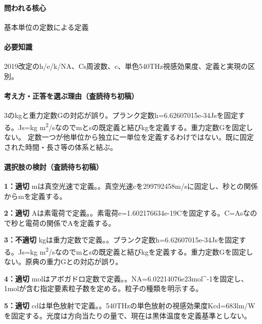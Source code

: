 \paragraph{問われる核心} 基本単位の定数による定義

\paragraph{必要知識} 2019改定のh/e/k/NA、Cs周波数、c、単色540THz視感効果度、定義と実現の区別。

\paragraph{考え方・正答を選ぶ理由（査読待ち初稿）} 3のkgと重力定数Gの対応が誤り。プランク定数h=\allowbreak{}6.62607015e-34Jsを固定する。Js=\allowbreak{}kg m\textsuperscript{2}/sなのでmとsの既定義と結びkgを定義する。重力定数Gを固定しない。 定数一つが他単位から独立に一単位を定義するわけではない。既に固定された時間・長さ等の体系と結ぶ。

\paragraph{選択肢の検討（査読待ち初稿）}\mbox{}\par

\noindent\textbf{1：適切} mは真空光速で定義。。真空光速cを299792458m/sに固定し、秒との関係からmを定義する。\par

\noindent\textbf{2：適切} Aは素電荷で定義。。素電荷e=\allowbreak{}1.602176634e-19Cを固定する。C=\allowbreak{}Asなので秒と電荷の関係でAを定義する。\par

\noindent\textbf{3：不適切} kgは重力定数で定義。。プランク定数h=\allowbreak{}6.62607015e-34Jsを固定する。Js=\allowbreak{}kg m\textsuperscript{2}/sなのでmとsの既定義と結びkgを定義する。重力定数Gを固定しない。原典の重力Gとの対応が誤り。\par

\noindent\textbf{4：適切} molはアボガドロ定数で定義。。NA=\allowbreak{}6.02214076e23mol\textasciicircum{}-1を固定し、1molが含む指定要素粒子数を定める。粒子の種類を明示する。\par

\noindent\textbf{5：適切} cdは単色放射で定義。。540THzの単色放射の視感効果度Kcd=\allowbreak{}683lm/Wを固定する。光度は方向当たりの量で、現在は黒体温度を定義基準としない。\par

